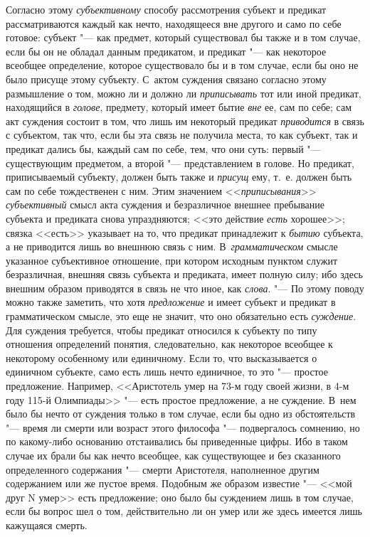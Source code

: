 Согласно этому
{\em субъективному}
способу рассмотрения субъект и предикат рассматриваются
каждый как нечто, находящееся вне другого и само по себе готовое: субъект
"--- как предмет, который существовал бы также и в том случае,
если бы он не обладал данным предикатом, и предикат "--- как
некоторое всеобщее определение, которое существовало бы и в том случае,
если бы оно не было присуще этому субъекту. С~актом суждения связано
согласно этому размышление о том, можно ли и должно ли
{\em приписывать} тот или
иной предикат, находящийся в
{\em голове}, предмету,
который имеет бытие {\em вне}
ее, сам по себе; сам акт суждения состоит в том, что лишь им
некоторый предикат {\em приводится}
в связь с субъектом, так что, если бы эта связь не получила
места, то как субъект, так и предикат дались бы, каждый сам по себе, тем,
что они суть: первый "--- существующим предметом, а второй
"--- представлением в голове. Но предикат, приписываемый
субъекту, должен быть также и
{\em присущ} ему, т.~е.
должен быть сам по себе тождественен с ним. Этим значением
<<{\em приписывания}>>
{\em субъективный} смысл
акта суждения и безразличное внешнее пребывание субъекта и предиката снова
упраздняются; <<это действие {\em есть}
хорошее>>; связка <<есть>> указывает на то, что предикат
принадлежит к {\em бытию}
субъекта, а не приводится лишь во внешнюю связь с ним.
В~{\em грамматическом}
смысле указанное субъективное отношение, при котором исходным
пунктом служит безразличная, внешняя связь субъекта и предиката, имеет
полную силу; ибо здесь внешним образом приводятся в связь не что иное, как
{\em слова}. "--- По этому
поводу можно также заметить, что хотя
{\em предложение} и имеет
субъект и предикат в грамматическом смысле, это еще не значит, что оно
обязательно есть {\em суждение}.
Для суждения требуется, чтобы предикат относился к субъекту
по типу отношения определений понятия, следовательно, как некоторое
всеобщее к некоторому особенному или единичному. Если то,
что высказывается о единичном субъекте, само есть лишь нечто единичное, то
это "--- простое предложение. Например, <<Аристотель умер на
73-м году своей
жизни,
в 4-м году 115-й Олимпиады>> "--- есть простое
предложение, а не суждение. В~нем было бы нечто от суждения только в том
случае, если бы одно из обстоятельств "--- время ли смерти или
возраст этого философа "--- подвергалось сомнению, но по
какому-либо основанию отстаивались бы приведенные цифры. Ибо в таком случае
их брали бы как нечто всеобщее, как существующее и без сказанного
определенного содержания "--- смерти Аристотеля, наполненное
другим содержанием или же пустое время. Подобным же образом известие
"--- <<мой друг N умер>> есть предложение; оно было бы суждением
лишь в том случае, если бы вопрос шел о том, действительно ли он умер или
же здесь имеется лишь кажущаяся смерть.

